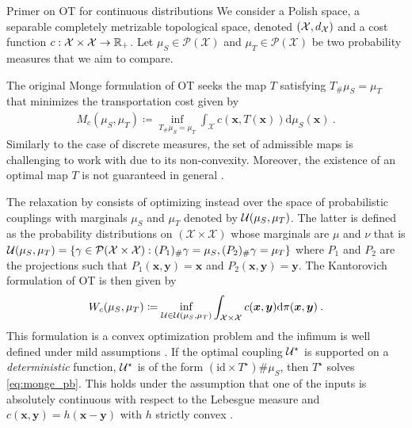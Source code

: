 \begin{mem1}{Primer on OT for continuous distributions}\label{mem:ot_continuous}
    We consider a Polish space, \ie a separable completely metrizable topological space, denoted $(\mathcal{X}, d_{{\mathcal{X}}})$ and a cost function $c : \mathcal{X} \times \mathcal{X} \to \mathbb{R}_+$. Let $\mu_S \in \mathcal{P}(\mathcal{X})$ and $\mu_T \in \mathcal{P}(\mathcal{X})$ be two probability measures that we aim to compare.

    The original Monge formulation \citep{monge1781memoire} of OT seeks the map $T$ satisfying $T_{\#}\mu_S = \mu_T$ that minimizes the transportation cost given by
    \begin{align}\label{eq:monge_pb_continuous}
        M_c(\mu_S, \mu_T) \coloneqq \inf_{T_{\#}\mu_S = \mu_T} \int_{\mathcal{X}} c(\bm{x}, T(\bm{x})) \mathrm{d}\mu_S(\bm{x}) \:.
    \end{align}
    Similarly to the case of discrete measures, the set of admissible maps is challenging to work with due to its non-convexity. Moreover, the existence of an optimal map \(T\) is not guaranteed in general \citep{santambrogio2015optimal}.

    The relaxation by \cite{kantorovich1942translocation} consists of optimizing instead over the space of probabilistic couplings with marginals $\mu_S$ and $\mu_T$ denoted by ${\mathcal{U}}(\mu_S, \mu_T)$. The latter is defined as the probability distributions on $(\mathcal{X} \times \mathcal{X})$ whose marginals are $\mu$ and $\nu$ that is ${\mathcal{U}}(\mu_S, \mu_T) = \left\{ \gamma \in \mathcal{P}(\mathcal{X} \times \mathcal{X}) : (P_{1})_\# \gamma = \mu_S, (P_{2})_\# \gamma = \mu_T \right\}$ where $P_{1}$ and $P_{2}$ are the projections such that $P_{1}(\bm{x}, \bm{y}) = \bm{x}$ and $P_{2}(\bm{x}, \bm{y}) = \bm{y}$.
    The Kantorovich formulation of OT is then given by
    \begin{align}\label{eq:Wasserstein}
        W_c(\mu_S, \mu_T) \coloneqq \inf_{{\mathcal{U}} \in {\mathcal{U}}(\mu_S, \mu_T)} \int_{\mathcal{X} \times \mathcal{X}} c(\bm{x}, \bm{y}) \mathrm{d}\pi(\bm{x}, \bm{y}) \:.
    \end{align}
    This formulation is a convex optimization problem and the infimum is well
    defined under mild assumptions \citep{santambrogio2015optimal}. If the optimal
    coupling ${\mathcal{U}}^\star$ is supported on a \emph{deterministic} function, \ie
    ${\mathcal{U}}^\star$ is of the form $(\mathrm{id} \times T^\star)\# \mu_S$, then
    $T^\star$ solves \eqref{eq:monge_pb}. This holds under the assumption that one
    of the inputs is absolutely continuous with respect to the Lebesgue measure
    and $c(\bm{x}, \bm{y}) = h(\bm{x} - \bm{y})$ with
    $h$ strictly convex \citep{gangbo1996geometry}.
    
    \end{mem1}

